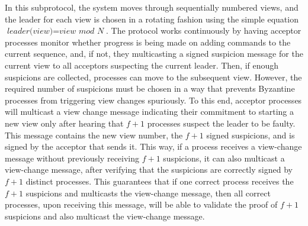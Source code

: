 In this subprotocol, the system moves through sequentially numbered views, and the leader for each view is chosen in a rotating fashion using the simple equation $\textit{leader(view)}=\textit{view mod N}$. The protocol works continuously by having acceptor processes monitor whether progress is being made on adding commands to the current sequence, and, if not, they multicasting a signed {\sc suspicion} message for the current view to all acceptors suspecting the current leader. Then, if enough suspicions are collected, processes can move to the subsequent view. However, the required number of suspicions must be chosen in a way that prevents Byzantine processes from triggering view changes spuriously. To this end, acceptor processes will multicast a view change message indicating their commitment to starting a new view only after hearing that $f+1$ processes suspect the leader to be faulty. This message contains the new view number, the $f+1$ signed suspicions, and is signed by the acceptor that sends it. This way, if a process receives a view-change message without previously receiving $f+1$ suspicions, it can also multicast a view-change message, after verifying that the suspicions are correctly signed by $f+1$ distinct processes.
This guarantees that if one correct process receives the $f+1$ suspicions and multicasts the view-change message, then all correct processes, upon receiving this message, will be able to validate the proof of $f+1$ suspicions and also multicast the view-change message.\par
